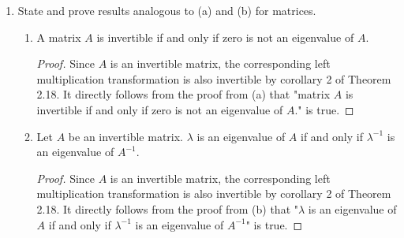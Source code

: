 \documentclass[11pt]{scrartcl}
\begin{document}
\begin{enumerate}[label=\alph*.]
{	      }
	\item{
	      State and prove results analogous to (a) and (b) for matrices.
	      \begin{enumerate}[label=(\alph*)]
		      \item{
					A matrix $A$ is invertible if and only if zero is not an eigenvalue of $A$.
					\begin{proof}
						Since $A$ is an invertible matrix, the corresponding left multiplication transformation
						is also invertible by corollary 2 of Theorem 2.18. It directly follows from the proof from (a)
						that "matrix $A$ is invertible if and only if zero is not an eigenvalue of $A$."
						is true.
					\end{proof}
		            }
		      \item{
		            Let $A$ be an invertible matrix.
					$\lambda$ is an eigenvalue of $A$ if and only if $\lambda^{-1}$ is an eigenvalue of $A^{-1}$.
					\begin{proof}
						Since $A$ is an invertible matrix, the corresponding left multiplication transformation
						is also invertible by corollary 2 of Theorem 2.18. It directly follows from the proof from (b)
						that "$\lambda$ is an eigenvalue of $A$ if and only if $\lambda^{-1}$ is an eigenvalue of $A^{-1}$"
						is true.
					\end{proof}
		            }
	      \end{enumerate}
	      }
\end{enumerate}
\end{document}
